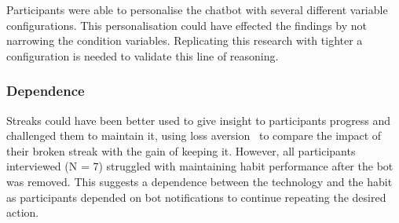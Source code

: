 Participants were able to personalise the chatbot with several different variable configurations. This personalisation could have effected the findings by not narrowing the condition variables. Replicating this research with tighter a configuration is needed to validate this line of reasoning.


\subsubsection*{Dependence}
Streaks could have been better used to give insight to participants progress and challenged them to maintain it, using loss aversion~\cite{loss_aversion} to compare the impact of their broken streak with the gain of keeping it. However, all participants interviewed (N = 7) struggled with maintaining habit performance after the bot was removed. This suggests a dependence between the technology and the habit as participants depended on bot notifications to continue repeating the desired action.


